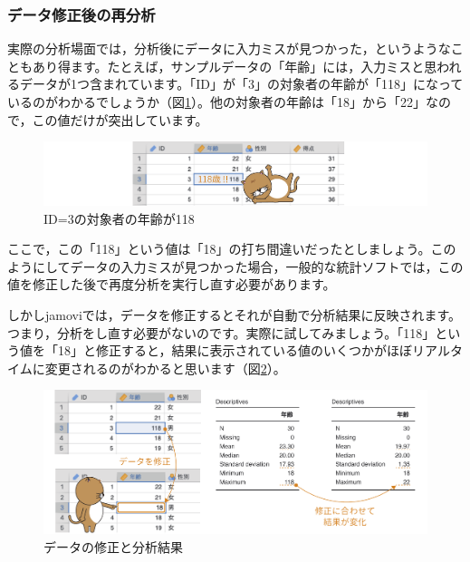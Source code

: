 \documentclass[
  12pt,
  a5jpaper,
  lualatex, ja=standard]{bxjsbook}
\begin{document}
\hypertarget{ux30c7ux30fcux30bfux4feeux6b63ux5f8cux306eux518dux5206ux6790}{%
\subsubsection*{データ修正後の再分析}\label{ux30c7ux30fcux30bfux4feeux6b63ux5f8cux306eux518dux5206ux6790}}

実際の分析場面では，分析後にデータに入力ミスが見つかった，というようなこともあり得ます。たとえば，サンプルデータの「年齢」には，入力ミスと思われるデータが1つ含まれています。「ID」が「3」の対象者の年齢が「118」になっているのがわかるでしょうか（図\ref{fig:bs2-data-error}）。他の対象者の年齢は「18」から「22」なので，この値だけが突出しています。

\begin{figure}[!ht]

{\centering \includegraphics[width=1\linewidth]{images/basics2/data-error} 

}

\caption{ID=3の対象者の年齢が118}\label{fig:bs2-data-error}
\end{figure}

ここで，この「118」という値は「18」の打ち間違いだったとしましょう。このようにしてデータの入力ミスが見つかった場合，一般的な統計ソフトでは，この値を修正した後で再度分析を実行し直す必要があります。

しかしjamoviでは，データを修正するとそれが自動で分析結果に反映されます。つまり，分析をし直す必要がないのです。実際に試してみましょう。「118」という値を「18」と修正すると，結果に表示されている値のいくつかがほぼリアルタイムに変更されるのがわかると思います（図\ref{fig:bs2-edit-analysis}）。

\begin{figure}[!ht]

{\centering \includegraphics[width=1\linewidth]{images/basics2/edit-analysis} 

}

\caption{データの修正と分析結果}\label{fig:bs2-edit-analysis}
\end{figure}
\end{document}
